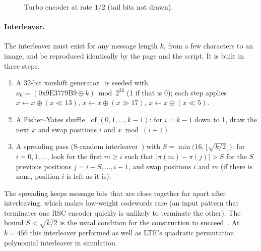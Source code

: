 \documentclass[11pt,a4paper]{article}
\theoremstyle{remark}
\begin{document}
\begin{figure}[ht]
\centering
{}
\caption{Turbo encoder at rate $1/2$ (tail bits not drawn).}
\label{fig:turbo}
\end{figure}

\paragraph{Interleaver.}
The interleaver must exist for any message length $k$, from a few characters to an image, and be reproduced identically by the page and the script. It is built in three steps.
\begin{enumerate}
\item A 32-bit xorshift generator~\cite{marsaglia} is seeded with $x_0 = (\text{0x9E3779B9} \oplus k) \bmod 2^{32}$ (1 if that is 0); each step applies $x \leftarrow x \oplus (x \ll 13)$, $x \leftarrow x \oplus (x \gg 17)$, $x \leftarrow x \oplus (x \ll 5)$.
\item A Fisher--Yates shuffle~\cite{durstenfeld,knuth} of $(0, 1, \dots, k-1)$: for $i = k-1$ down to 1, draw the next $x$ and swap positions $i$ and $x \bmod (i+1)$.
\item A spreading pass (S-random interleaver~\cite{dolinar}) with $S = \min\bigl(16, \lfloor \sqrt{k/2} \rfloor\bigr)$: for $i = 0, 1, \dots$, look for the first $m \ge i$ such that $|\pi(m) - \pi(j)| > S$ for the $S$ previous positions $j = i-S, \dots, i-1$, and swap positions $i$ and $m$ (if there is none, position $i$ is left as it is).
\end{enumerate}
The spreading keeps message bits that are close together far apart after interleaving, which makes low-weight codewords rare (an input pattern that terminates one RSC encoder quickly is unlikely to terminate the other). The bound $S < \sqrt{k/2}$ is the usual condition for the construction to succeed~\cite{dolinar}. At $k = 456$ this interleaver performed as well as LTE's quadratic permutation polynomial interleaver in simulation.
\end{document}
